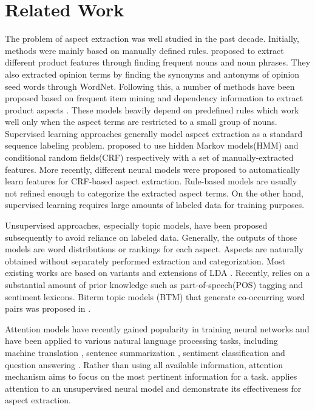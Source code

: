 \documentclass{article}
\begin{document}
\section{Related Work}
\label{sec:related}
The problem of aspect extraction was well studied in the past decade. Initially, methods were mainly based on manually defined rules. \cite{HuLiu2004} proposed to extract different product features through finding frequent nouns and noun phrases. They also extracted opinion terms by finding the synonyms and antonyms of opinion seed words through WordNet. Following this, a number of methods have been proposed based on frequent item mining and dependency information to extract product aspects \cite{Zhuang2006, Somasundarn2009, Qiu2011}. These models heavily depend on predefined rules which work well only when the aspect terms are restricted to a small group of nouns. Supervised learning approaches generally model aspect extraction as a standard sequence labeling problem. \cite{Jin2009, Li2010} proposed to use hidden Markov models(HMM) and conditional random fields(CRF) respectively with a set of manually-extracted features. More recently, different neural models \cite{Yin2016, Wang2016} were proposed to automatically learn features for CRF-based aspect extraction. Rule-based models are usually not refined enough to categorize the extracted aspect terms. On the other hand, supervised learning requires large amounts of labeled data for training purposes.

Unsupervised approaches, especially topic models, have been proposed subsequently to avoid reliance on labeled data. Generally, the outputs of those models are word distributions or rankings for each aspect. Aspects are naturally obtained without separately performed extraction and categorization. Most existing works \cite{Brody2010UAS, Zhao2010JMA, Mukherjee2012, Chen2014} are based on variants and extensions of LDA \cite{Blei2003}. Recently, \cite{Wang2015} relies on a substantial amount of prior knowledge such as part-of-speech(POS) tagging and sentiment lexicons. Biterm topic models (BTM) that generate co-occurring word pairs was proposed in \cite{Yan2013}.

Attention models \cite{Mnih2014} have recently gained popularity in training neural networks and have been applied to various natural language processing tasks, including machine translation \cite{Bahdanau2015NMT}, sentence summarization \cite{Rush2015}, sentiment classification \cite{Chen2016} and question answering \cite{Herman2015}. Rather than using all available information, attention mechanism aims to focus on the most pertinent information for a task. \cite{He2018ABAE} applies attention to an unsupervised neural model and demonstrate its effectiveness for aspect extraction.
\end{document}
